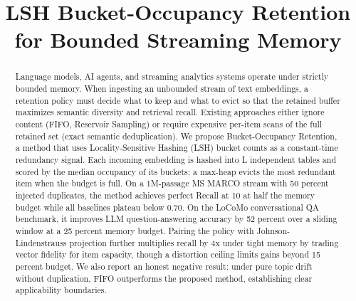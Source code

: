 \documentclass[conference]{IEEEtran}
\begin{document}
\pagestyle{plain}

\title{LSH Bucket-Occupancy Retention for Bounded Streaming Memory}


\author{
\and
{}
}

\maketitle

\begin{abstract}
Language models, AI agents, and streaming analytics systems operate
under strictly bounded memory. When ingesting an unbounded stream of
text embeddings, a retention policy must decide what to keep and what to
evict so that the retained buffer maximizes semantic diversity and
retrieval recall. Existing approaches either ignore content (FIFO,
Reservoir Sampling) or require expensive per-item scans of the full
retained set (exact semantic deduplication). We propose Bucket-Occupancy
Retention, a method that uses Locality-Sensitive Hashing (LSH) bucket
counts as a constant-time redundancy signal. Each incoming embedding is
hashed into L independent tables and scored by the median occupancy of
its buckets; a max-heap evicts the most redundant item when the budget
is full. On a 1M-passage MS MARCO stream with 50 percent injected
duplicates, the method achieves perfect Recall at 10 at half the memory
budget while all baselines plateau below 0.70. On the LoCoMo
conversational QA benchmark, it improves LLM question-answering accuracy
by 52 percent over a sliding window at a 25 percent memory budget.
Pairing the policy with Johnson-Lindenstrauss projection further
multiplies recall by 4x under tight memory by trading vector fidelity
for item capacity, though a distortion ceiling limits gains beyond 15
percent budget. We also report an honest negative result: under pure
topic drift without duplication, FIFO outperforms the proposed method,
establishing clear applicability boundaries.
\end{abstract}
\end{document}
